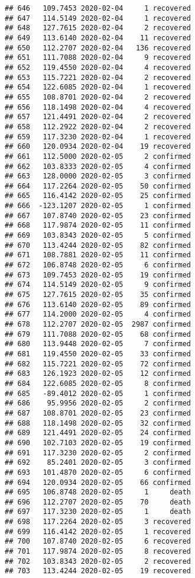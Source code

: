 \documentclass[
]{article}
\begin{document}
\begin{verbatim}
## 646   109.7453 2020-02-04     1 recovered
## 647   114.5149 2020-02-04     1 recovered
## 648   127.7615 2020-02-04     2 recovered
## 649   113.6140 2020-02-04    11 recovered
## 650   112.2707 2020-02-04   136 recovered
## 651   111.7088 2020-02-04     9 recovered
## 652   119.4550 2020-02-04     4 recovered
## 653   115.7221 2020-02-04     2 recovered
## 654   122.6085 2020-02-04     1 recovered
## 655   108.8701 2020-02-04     2 recovered
## 656   118.1498 2020-02-04     4 recovered
## 657   121.4491 2020-02-04     2 recovered
## 658   112.2922 2020-02-04     2 recovered
## 659   117.3230 2020-02-04     1 recovered
## 660   120.0934 2020-02-04    19 recovered
## 661   112.5000 2020-02-05     2 confirmed
## 662   103.8333 2020-02-05     4 confirmed
## 663   128.0000 2020-02-05     3 confirmed
## 664   117.2264 2020-02-05    50 confirmed
## 665   116.4142 2020-02-05    25 confirmed
## 666  -123.1207 2020-02-05     1 confirmed
## 667   107.8740 2020-02-05    23 confirmed
## 668   117.9874 2020-02-05    11 confirmed
## 669   103.8343 2020-02-05     5 confirmed
## 670   113.4244 2020-02-05    82 confirmed
## 671   108.7881 2020-02-05    11 confirmed
## 672   106.8748 2020-02-05     6 confirmed
## 673   109.7453 2020-02-05    19 confirmed
## 674   114.5149 2020-02-05     9 confirmed
## 675   127.7615 2020-02-05    35 confirmed
## 676   113.6140 2020-02-05    89 confirmed
## 677   114.2000 2020-02-05     4 confirmed
## 678   112.2707 2020-02-05  2987 confirmed
## 679   111.7088 2020-02-05    68 confirmed
## 680   113.9448 2020-02-05     7 confirmed
## 681   119.4550 2020-02-05    33 confirmed
## 682   115.7221 2020-02-05    72 confirmed
## 683   126.1923 2020-02-05    12 confirmed
## 684   122.6085 2020-02-05     8 confirmed
## 685   -89.4012 2020-02-05     1 confirmed
## 686    95.9956 2020-02-05     2 confirmed
## 687   108.8701 2020-02-05    23 confirmed
## 688   118.1498 2020-02-05    32 confirmed
## 689   121.4491 2020-02-05    24 confirmed
## 690   102.7103 2020-02-05    19 confirmed
## 691   117.3230 2020-02-05     2 confirmed
## 692    85.2401 2020-02-05     3 confirmed
## 693   101.4870 2020-02-05     6 confirmed
## 694   120.0934 2020-02-05    66 confirmed
## 695   106.8748 2020-02-05     1     death
## 696   112.2707 2020-02-05    70     death
## 697   117.3230 2020-02-05     1     death
## 698   117.2264 2020-02-05     3 recovered
## 699   116.4142 2020-02-05     1 recovered
## 700   107.8740 2020-02-05     6 recovered
## 701   117.9874 2020-02-05     8 recovered
## 702   103.8343 2020-02-05     2 recovered
## 703   113.4244 2020-02-05    19 recovered

\end{verbatim}
\end{document}

